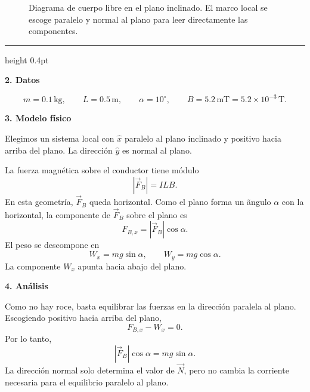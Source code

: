\documentclass[11pt]{article}
\newcommand{\soluciontitulo}{%
  \par\medskip
  \noindent{\large\bfseries Solución.}\par
  \vspace{0.2em}\hrule height 0.4pt \vspace{0.7em}%
}
\newcommand{\paso}[1]{%
  \par\medskip
  \noindent\textbf{#1}\par
  \vspace{0.1em}%
}
\begin{document}
\begin{figure}[h!]
\caption{Diagrama de cuerpo libre en el plano inclinado. El marco local se escoge paralelo y normal al plano para leer directamente las componentes.}
\end{figure}


\soluciontitulo

\paso{2. Datos}
\begin{equation*}
    m=0.1\,\mathrm{kg},
    \qquad
    L=0.5\,\mathrm m,
    \qquad
    \alpha=10^\circ,
    \qquad
    B=5.2\,\mathrm{mT}=5.2\times10^{-3}\,\mathrm T.
\end{equation*}

\paso{3. Modelo f\'isico}
Elegimos un sistema local con $\hat x$ paralelo al plano inclinado y positivo hacia arriba del plano. La direcci\'on $\hat y$ es normal al plano.

La fuerza magn\'etica sobre el conductor tiene m\'odulo
\begin{equation*}
    |\vec F_B|=ILB.
\end{equation*}
En esta geometr\'ia, $\vec F_B$ queda horizontal. Como el plano forma un \~angulo $\alpha$ con la horizontal, la componente de $\vec F_B$ sobre el plano es
\begin{equation*}
    F_{B,x}=|\vec F_B|\cos\alpha.
\end{equation*}
El peso se descompone en
\begin{equation*}
    W_x=mg\sin\alpha,
    \qquad
    W_y=mg\cos\alpha.
\end{equation*}
La componente $W_x$ apunta hacia abajo del plano.

\paso{4. An\'alisis}
Como no hay roce, basta equilibrar las fuerzas en la direcci\'on paralela al plano. Escogiendo positivo hacia arriba del plano,
\begin{equation*}
    F_{B,x}-W_x=0.
\end{equation*}
Por lo tanto,
\begin{equation*}
    |\vec F_B|\cos\alpha=mg\sin\alpha.
\end{equation*}
La direcci\'on normal solo determina el valor de $\vec N$, pero no cambia la corriente necesaria para el equilibrio paralelo al plano.
\end{document}
